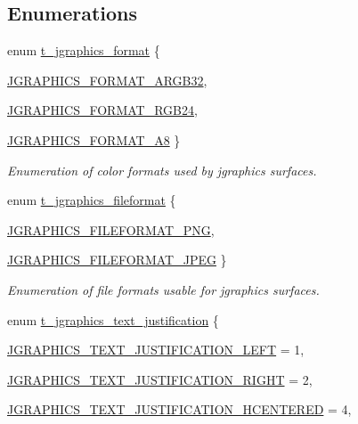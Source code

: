 \subsection*{Enumerations}
\begin{DoxyCompactItemize}
\item 
enum \hyperlink{group__jgraphics_ga4c4fa437dbfffb2c406787efa7701604}{t\_\-jgraphics\_\-format} \{ \par
\hyperlink{group__jgraphics_gga4c4fa437dbfffb2c406787efa7701604a072f2e8fde1742abd692b9de9e7d1011}{JGRAPHICS\_\-FORMAT\_\-ARGB32}, 
\par
\hyperlink{group__jgraphics_gga4c4fa437dbfffb2c406787efa7701604a3021abdd63af373988e5d2b3a696a6d2}{JGRAPHICS\_\-FORMAT\_\-RGB24}, 
\par
\hyperlink{group__jgraphics_gga4c4fa437dbfffb2c406787efa7701604ad8fca751059bf8cef944dfe0b98ef191}{JGRAPHICS\_\-FORMAT\_\-A8}
 \}
\begin{DoxyCompactList}\small\item\em Enumeration of color formats used by jgraphics surfaces. \item\end{DoxyCompactList}\item 
enum \hyperlink{group__jgraphics_ga81465e1a6989399e343d081defd90dbe}{t\_\-jgraphics\_\-fileformat} \{ \par
\hyperlink{group__jgraphics_gga81465e1a6989399e343d081defd90dbea2370a1696e7b478145fece2d7b2ee903}{JGRAPHICS\_\-FILEFORMAT\_\-PNG}, 
\par
\hyperlink{group__jgraphics_gga81465e1a6989399e343d081defd90dbeae2a7397922debc6f37505eb58aa58d2f}{JGRAPHICS\_\-FILEFORMAT\_\-JPEG}
 \}
\begin{DoxyCompactList}\small\item\em Enumeration of file formats usable for jgraphics surfaces. \item\end{DoxyCompactList}\item 
enum \hyperlink{group__jgraphics_ga3519fa317c6811b619af2d70e3c1eca7}{t\_\-jgraphics\_\-text\_\-justification} \{ \par
\hyperlink{group__jgraphics_gga3519fa317c6811b619af2d70e3c1eca7a5e4867b2a5e3789724b6c0d70679c4e3}{JGRAPHICS\_\-TEXT\_\-JUSTIFICATION\_\-LEFT} =  1, 
\par
\hyperlink{group__jgraphics_gga3519fa317c6811b619af2d70e3c1eca7a3eb14134e02256092b705f04d20c6adb}{JGRAPHICS\_\-TEXT\_\-JUSTIFICATION\_\-RIGHT} =  2, 
\par
\hyperlink{group__jgraphics_gga3519fa317c6811b619af2d70e3c1eca7aaef852ad474ffc8ed5cfd7bf4d5813fa}{JGRAPHICS\_\-TEXT\_\-JUSTIFICATION\_\-HCENTERED} =  4, 

\end{DoxyCompactItemize}
